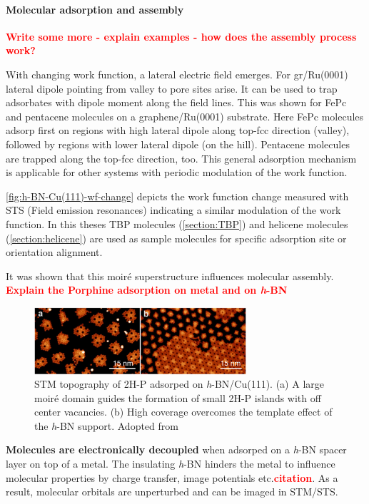 \paragraph{Molecular adsorption and assembly}
\label{section:Mol-on-h-BN}
\textcolor{red}{\textbf{Write some more - explain examples - how does the assembly process work?}}

With changing work function, a lateral electric field emerges. For gr/Ru(0001) lateral dipole pointing from valley to pore sites arise.\cite{zhang_assembly_2011} It can be used to trap adsorbates with dipole moment along the field lines. This was shown for FePc and pentacene molecules on a graphene/Ru(0001) substrate. Here FePc molecules adsorp first on regions with high lateral dipole along top-fcc direction (valley), followed by regions with lower lateral dipole (on the hill). Pentacene molecules are trapped along the top-fcc direction, too.\cite{zhang_assembly_2011}  This general adsorption mechanism is applicable for other systems with periodic modulation of the work function.

\autoref{fig:h-BN-Cu(111)-wf-change} depicts the work function change measured with STS (Field emission resonances) indicating a similar modulation of the work function. In this theses TBP molecules (\autoref{section:TBP}) and helicene molecules (\autoref{section:helicene}) are used as sample molecules for specific adsorption site or orientation alignment.

It was shown that this moir\'e superstructure influences molecular assembly. 
\textcolor{red}{\textbf{Explain the Porphine adsorption on metal and on \textit{h}-BN}}

\begin{figure} \centering
	\includegraphics[width=0.7\textwidth]{./images/2H-P-hBN-Cu111-joshi}%
	\caption{STM topography of 2H-P adsorped on \textit{h}-BN/Cu(111). (a) A large moir\'e domain guides the formation of small 2H-P islands with off center vacancies. (b) High coverage overcomes the template effect of the \textit{h}-BN support. Adopted from \cite{diss-joshi}}
	\label{fig:2H-P-hBN-Cu111-joshi}
\end{figure}

\textbf{Molecules are electronically decoupled} when adsorped on a \textit{h}-BN spacer layer on top of a metal. The insulating \textit{h}-BN hinders the metal to influence molecular properties by charge transfer, image potentials etc.\textcolor{red}{\textbf{citation}}. As a result, molecular orbitals are unperturbed and can be imaged in STM/STS.
